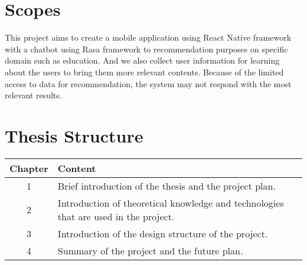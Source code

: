 \section{Scopes}
    This project aims to create a mobile application using React Native framework with a chatbot using Rasa framework to recommendation purposes on specific domain such as education. And we also collect user information for learning about the users to bring them more relevant contents.
    Because of the limited access to data for recommendation, the system may not respond with the most relevant results.
\newpage
\section{Thesis Structure}
\begin{tabular}{|c|p{10cm}|} 
    \hline
    Chapter & Content \\
    \hline
    1 & Brief introduction of the thesis and the project plan.\\
    \hline 
    2 & Introduction of theoretical knowledge and technologies that are used in the project.\\
    \hline
    3 & Introduction of the design structure of the project.\\
    \hline 
    4 & Summary of the project and the future plan.\\
    \hline
\end{tabular}
